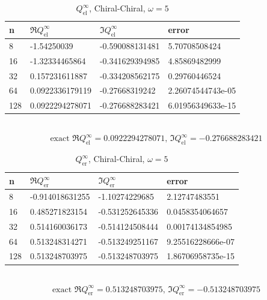 \begin{table}
  \centering
  \renewcommand{\arraystretch}{1.1}
  \caption{$Q_\text{el}^\infty$, Chiral-Chiral, $\omega=5$}
  \begin{tabular}{@{}llll@{}}
    \toprule
    n & $\Re{Q_\text{el}^\infty}$ & $\Im{Q_\text{el}^\infty}$ & error \\
    \midrule
8 & -1.54250039 & -0.590088131481 & 5.70708508424\\ 
16 & -1.32334465864 & -0.341629394985 & 4.85869482999\\ 
32 & 0.157231611887 & -0.334208562175 & 0.29760446524\\ 
64 & 0.0922336179119 & -0.27668319242 & 2.26074544743e-05\\ 
128 & 0.0922294278071 & -0.276688283421 & 6.01956349633e-15\\ 
    \bottomrule
  \end{tabular}
  \\ 
  $$\text{exact }\Re{Q_\text{el}^\infty}=0.0922294278071,\,\Im{Q_\text{el}^\infty}=-0.276688283421$$  
\end{table}

\begin{table}
  \centering
  \renewcommand{\arraystretch}{1.1}
  \caption{$Q_\text{er}^\infty$, Chiral-Chiral, $\omega=5$}
  \begin{tabular}{@{}llll@{}}
    \toprule
    n & $\Re{Q_\text{er}^\infty}$ & $\Im{Q_\text{er}^\infty}$ & error \\
    \midrule
8 & -0.914018631255 & -1.10274229685 & 2.12747483551\\ 
16 & 0.485271823154 & -0.531252645336 & 0.0458354064657\\ 
32 & 0.514160036173 & -0.514124508444 & 0.00174134854985\\ 
64 & 0.513248314271 & -0.513249251167 & 9.25516228666e-07\\ 
128 & 0.513248703975 & -0.513248703975 & 1.86706958735e-15\\ 
    \bottomrule
  \end{tabular}
  \\ 
  $$\text{exact }\Re{Q_\text{er}^\infty}=0.513248703975,\,\Im{Q_\text{er}^\infty}=-0.513248703975$$  
\end{table}

